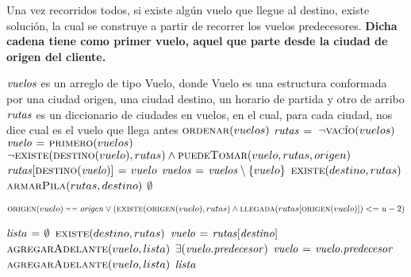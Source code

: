 Una vez recorridos todos, si existe algún vuelo que llegue al destino, existe 
solución, la cual se construye a partir de recorrer los vuelos predecesores.
\textbf{Dicha cadena tiene como primer vuelo, aquel que parte desde la ciudad 
de origen del cliente.}


\begin{codebox}
\li \Comment $\id{vuelos}$ es un arreglo de tipo Vuelo, donde Vuelo es una 
    estructura conformada por una ciudad origen, una ciudad destino, un horario 
    de partida y otro de arribo
\li \Comment $\id{rutas}$ es un diccionario de ciudades en vuelos, en el cual, 
    para cada ciudad, nos dice cual es el vuelo que llega antes
\li $\textnormal{\scshape ordenar}(vuelos)$
\li $\id{rutas} \gets \empty$
\li \While $\neg \textnormal{\scshape vacío}(vuelos)$ 
\li     \Do
            $\id{vuelo} \gets \proc{primero}(vuelos)$
\li         \If $\neg \textnormal{\scshape existe}(\textnormal{\scshape destino}(vuelo),rutas) \land
                \textnormal{\scshape puedeTomar}(vuelo,rutas,origen)$ 
\li             \Then
                    $\id{rutas[\proc{destino}(vuelo)]} \gets vuelo$
                \End
\li         $\id{vuelos} \gets \id{vuelos} \setminus \{vuelo\}$
        \End
\li \If $\textnormal{\scshape existe}(destino,rutas)$ 
\li     \Then
            \Return $\textnormal{\scshape armarPila}(rutas,destino)$
\li     \Else
            \Return $\emptyset$
        \End
\end{codebox}


\begin{codebox}
\li \Return $\proc{origen}(vuelo) \isequal \id{origen} \lor
            (\proc{existe}(\proc{origen}(vuelo),rutas) \land
             \proc{llegada}(rutas[\proc{origen}(vuelo)]) <=
             \id{u} - 2)$
\end{codebox}


\begin{codebox}
\li $\id{lista} \gets \emptyset$
\li \If $\textnormal{\scshape existe}(destino,rutas)$
\li     \Then
            $\id{vuelo} \gets \id{rutas[destino]}$
            $\textnormal{\scshape agregarAdelante}(vuelo,lista)$
\li         \While $\exists (\id{vuelo.predecesor})$ 
\li             \Do
                    $\id{vuelo} \gets \id{vuelo.predecesor}$
                    $\textnormal{\scshape agregarAdelante}(vuelo,lista)$
                \End
        \Else
\li         \Return $\id{lista}$
        \End
\end{codebox}



\newpage
